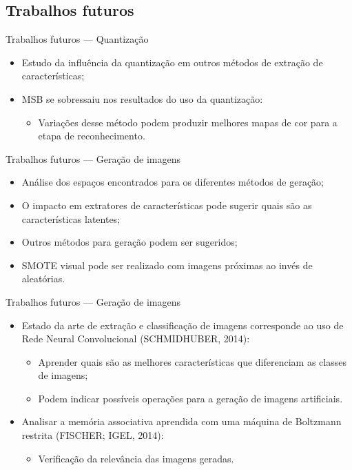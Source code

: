 \documentclass[10pt]{beamer}
\begin{document}
\subsection{Trabalhos futuros}
\begin{frame}{Trabalhos futuros --- Quantização}
  \setlength\leftmargini{1em}
    \begin{itemize}
    \item Estudo da influência da quantização em outros métodos de extração de características;
    \item MSB se sobressaiu nos resultados do uso da quantização:
    \begin{itemize}
      \item Variações desse método podem produzir melhores mapas de cor para a etapa de reconhecimento.
    \end{itemize}
  \end{itemize}
\end{frame}
\begin{frame}{Trabalhos futuros --- Geração de imagens}
  \setlength\leftmargini{1em}
    \begin{itemize}
  \item Análise dos espaços encontrados para os diferentes métodos de geração;
  \item O impacto em extratores de características pode sugerir quais são as características latentes;
  \item Outros métodos para geração podem ser sugeridos;
  \item SMOTE visual pode ser realizado com imagens próximas ao invés de aleatórias.
 \end{itemize}
\end{frame}
\begin{frame}{Trabalhos futuros --- Geração de imagens}
  \setlength\leftmargini{1em}
    \begin{itemize}
  \item Estado da arte de extração e classificação de imagens corresponde ao uso de Rede Neural Convolucional (SCHMIDHUBER, 2014):
    \begin{itemize}
    \item Aprender quais são as melhores características que diferenciam as classes de imagens;
    \item Podem indicar possíveis operações para a geração de imagens artificiais.
    \end{itemize}
  \item Analisar a memória associativa aprendida com uma máquina de Boltzmann restrita (FISCHER; IGEL, 2014):
    \begin{itemize}
    \item Verificação da relevância das imagens geradas.
    \end{itemize}
  \end{itemize}
\end{frame}
\end{document}
